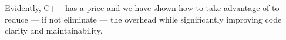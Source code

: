 Evidently, C++ has a price and we have shown how to take advantage
of  to reduce --- if not eliminate --- the overhead while
significantly improving code clarity and maintainability. 




\address{Dirk Eddelbuettel\\
  Debian Project\\
  Chicago, IL\\
  USA}\\

\address{Romain Fran\c{c}ois\\
  Professionnal R Enthusiast\\
  3 rue Emile Bonnet, 34 090 Montpellier\\
  FRANCE}\\

